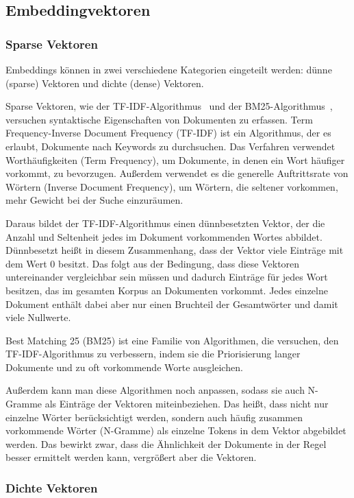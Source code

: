 \subsection{Embeddingvektoren}

\subsubsection{Sparse Vektoren}

Embeddings können in zwei verschiedene Kategorien eingeteilt werden: dünne (sparse) Vektoren und dichte (dense) Vektoren.

Sparse Vektoren, wie der TF-IDF-Algorithmus~\cite{sparckjones1972} und der BM25-Algorithmus~\cite{harman1995}, versuchen syntaktische Eigenschaften von Dokumenten zu erfassen.
Term Frequency-Inverse Document Frequency (TF-IDF) ist ein Algorithmus, der es erlaubt, Dokumente nach Keywords zu durchsuchen.
Das Verfahren verwendet Worthäufigkeiten (Term Frequency), um Dokumente, in denen ein Wort häufiger vorkommt, zu bevorzugen.
Außerdem verwendet es die generelle Auftrittsrate von Wörtern (Inverse Document Frequency), um Wörtern, die seltener vorkommen, mehr Gewicht bei der Suche einzuräumen.

Daraus bildet der TF-IDF-Algorithmus einen dünnbesetzten Vektor, der die Anzahl und Seltenheit jedes im Dokument vorkommenden Wortes abbildet.
Dünnbesetzt heißt in diesem Zusammenhang, dass der Vektor viele Einträge mit dem Wert 0 besitzt.
Das folgt aus der Bedingung, dass diese Vektoren untereinander vergleichbar sein müssen und dadurch Einträge für jedes Wort besitzen, das im gesamten Korpus an Dokumenten vorkommt.
Jedes einzelne Dokument enthält dabei aber nur einen Bruchteil der Gesamtwörter und damit viele Nullwerte.

Best Matching 25 (BM25) ist eine Familie von Algorithmen, die versuchen, den TF-IDF-Algorithmus zu verbessern, indem sie die Priorisierung langer Dokumente und zu oft vorkommende Worte ausgleichen.~\cite{harman1995}

Außerdem kann man diese Algorithmen noch anpassen, sodass sie auch N-Gramme als Einträge der Vektoren miteinbeziehen.
Das heißt, dass nicht nur einzelne Wörter berücksichtigt werden, sondern auch häufig zusammen vorkommende Wörter (N-Gramme) als einzelne Tokens in dem Vektor abgebildet werden.
Das bewirkt zwar, dass die Ähnlichkeit der Dokumente in der Regel besser ermittelt werden kann, vergrößert aber die Vektoren.~\cite{dey2017}

\subsubsection{Dichte Vektoren}

